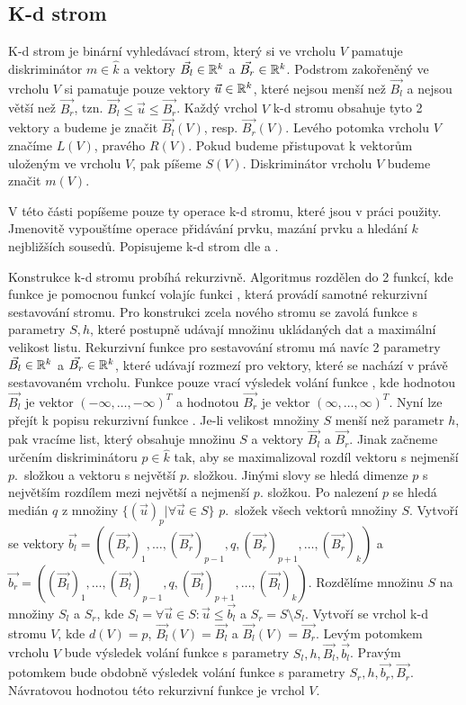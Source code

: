 \subsection{K-d strom}

K-d strom je binární vyhledávací strom, který si ve vrcholu $V$ pamatuje diskriminátor $m \in \hat k$ a vektory $\vec{B_l} \in \mathbb{R}^k$ a $\vec{B_r} \in \mathbb{R}^k$. Podstrom zakořeněný ve vrcholu $V$ si pamatuje pouze vektory $\vec{u} \in \mathbb{R}^k$, které nejsou menší než $\vec{B_l}$ a nejsou větší než $\vec{B_r}$, tzn. $\vec{B_l} \leq \vec{u} \leq \vec{B_r}$. Každý vrchol $V$ k-d stromu obsahuje tyto 2 vektory a budeme je značit $\vec{B_l}(V)$, resp. $\vec{B_r}(V)$. Levého potomka vrcholu $V$ značíme $L(V)$, pravého $R(V)$. Pokud budeme přistupovat k vektorům uloženým ve vrcholu $V$, pak píšeme $S(V)$. Diskriminátor vrcholu $V$ budeme značit $m(V)$.

V této části popíšeme pouze ty operace k-d stromu, které jsou v práci použity. Jmenovitě vypouštíme operace přidávání prvku, mazání prvku a hledání $k$ nejbližších sousedů. Popisujeme k-d strom dle \cite{kd-tree} a \cite{kd-tree-optimized}.

Konstrukce k-d stromu probíhá rekurzivně. Algoritmus rozdělen do 2 funkcí, kde funkce  je pomocnou funkcí volajíc funkci , která provádí samotné rekurzivní sestavování stromu. Pro konstrukci zcela nového stromu se zavolá funkce  s parametry $S, h$, které postupně udávají množinu ukládaných dat a maximální velikost listu. Rekurzivní funkce  pro sestavování stromu má navíc 2 parametry $\vec{B_l} \in \mathbb{R}^k$ a $\vec{B_r} \in \mathbb{R}^k$, které udávají rozmezí pro vektory, které se nachází v právě sestavovaném vrcholu. Funkce  pouze vrací výsledek volání funkce , kde hodnotou $\vec{B_l}$ je vektor $(-\infty, \ldots, -\infty)^T$ a hodnotou $\vec{B_r}$ je vektor $(\infty, \ldots, \infty)^T$. Nyní lze přejít k popisu rekurzivní funkce . Je-li velikost množiny $S$ menší než parametr $h$, pak vracíme list, který obsahuje množinu $S$ a vektory $\vec{B_l}$ a $\vec{B_r}$. Jinak začneme určením diskriminátoru $p \in \hat k$ tak, aby se maximalizoval rozdíl vektoru s nejmenší $p.$~složkou a vektoru s největší $p.$ složkou. Jinými slovy se hledá dimenze $p$ s největším rozdílem mezi největší a nejmenší $p.$ složkou. Po nalezení $p$ se hledá medián $q$ z množiny $\{(\vec{u})_p | \forall \vec{u} \in S\}$ $p.$~složek všech vektorů množiny $S$. Vytvoří se vektory $\vec{b_l} = ((\vec{B_r})_1, \ldots, (\vec{B_r})_{p-1}, q, (\vec{B_r})_{p+1}, \ldots, (\vec{B_r})_k)$ a $\vec{b_r} = ((\vec{B_l})_1, \ldots, (\vec{B_l})_{p-1}, q, (\vec{B_l})_{p+1}, \ldots, (\vec{B_l})_k)$. Rozdělíme množinu $S$ na množiny $S_l$ a $S_r$, kde $S_l = {\forall\vec{u} \in S: \vec{u} \leq \vec{b_l}}$ a $S_r = S \setminus S_l$. Vytvoří se vrchol k-d stromu $V$, kde $d(V) = p$, $\vec{B_l}(V) = \vec{B_l}$ a $\vec{B_l}(V) = \vec{B_r}$. Levým potomkem vrcholu $V$ bude výsledek volání funkce  s parametry $S_l, h, \vec{B_l}, \vec{b_l}$. Pravým potomkem bude obdobně výsledek volání funkce  s parametry $S_r, h, \vec{b_r}, \vec{B_r}$. Návratovou hodnotou této rekurzivní funkce je vrchol $V$.

